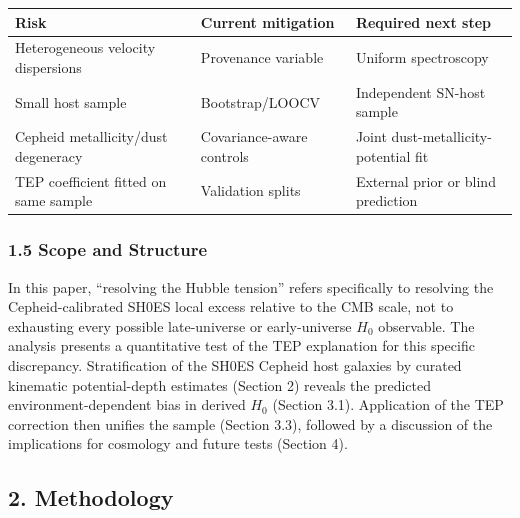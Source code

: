 \documentclass[
]{article}
\newcounter{none} %
\begin{document}
{\def\LTcaptype{none} %
\begin{longtable}[]{@{}
  >{\raggedright\arraybackslash}p{}
  >{\raggedright\arraybackslash}p{}
  >{\raggedright\arraybackslash}p{}@{}}
\toprule\noalign{}
\begin{minipage}[b]{\linewidth}\raggedright
Risk
\end{minipage} & \begin{minipage}[b]{\linewidth}\raggedright
Current mitigation
\end{minipage} & \begin{minipage}[b]{\linewidth}\raggedright
Required next step
\end{minipage} \\
\midrule\noalign{}
\endhead
\bottomrule\noalign{}
\endlastfoot
Heterogeneous velocity dispersions & Provenance variable & Uniform
spectroscopy \\
Small host sample & Bootstrap/LOOCV & Independent SN-host sample \\
Cepheid metallicity/dust degeneracy & Covariance-aware controls & Joint
dust-metallicity-potential fit \\
TEP coefficient fitted on same sample & Validation splits & External
prior or blind prediction \\
\end{longtable}
}

\subsubsection{1.5 Scope and Structure}\label{scope-and-structure}

In this paper, ``resolving the Hubble tension'' refers specifically to
resolving the Cepheid-calibrated SH0ES local excess relative to the CMB
scale, not to exhausting every possible late-universe or early-universe
\(H_0\) observable. The analysis presents a quantitative test of the TEP
explanation for this specific discrepancy. Stratification of the SH0ES
Cepheid host galaxies by curated kinematic potential-depth estimates
(Section 2) reveals the predicted environment-dependent bias in derived
\(H_0\) (Section 3.1). Application of the TEP correction then unifies
the sample (Section 3.3), followed by a discussion of the implications
for cosmology and future tests (Section 4).

\subsection{2. Methodology}\label{methodology}
\end{document}
